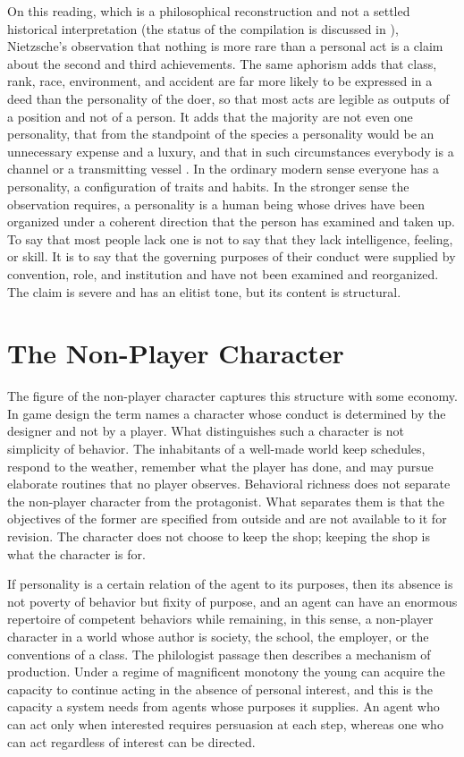 \documentclass[11pt]{article}
\begin{document}
On this reading, which is a philosophical reconstruction and not a settled historical interpretation (the status of the compilation is discussed in \cite{montinari2003}), Nietzsche's observation that nothing is more rare than a personal act \cite[Aph.\ 886(a)]{wtp2} is a claim about the second and third achievements. The same aphorism adds that class, rank, race, environment, and accident are far more likely to be expressed in a deed than the personality of the doer, so that most acts are legible as outputs of a position and not of a person. It adds that the majority are not even one personality, that from the standpoint of the species a personality would be an unnecessary expense and a luxury, and that in such circumstances everybody is a channel or a transmitting vessel \cite[Aph.\ 886(b)]{wtp2}. In the ordinary modern sense everyone has a personality, a configuration of traits and habits. In the stronger sense the observation requires, a personality is a human being whose drives have been organized under a coherent direction that the person has examined and taken up. To say that most people lack one is not to say that they lack intelligence, feeling, or skill. It is to say that the governing purposes of their conduct were supplied by convention, role, and institution and have not been examined and reorganized. The claim is severe and has an elitist tone, but its content is structural.

\section{The Non-Player Character}

The figure of the non-player character captures this structure with some economy. In game design the term names a character whose conduct is determined by the designer and not by a player. What distinguishes such a character is not simplicity of behavior. The inhabitants of a well-made world keep schedules, respond to the weather, remember what the player has done, and may pursue elaborate routines that no player observes. Behavioral richness does not separate the non-player character from the protagonist. What separates them is that the objectives of the former are specified from outside and are not available to it for revision. The character does not choose to keep the shop; keeping the shop is what the character is for.

If personality is a certain relation of the agent to its purposes, then its absence is not poverty of behavior but fixity of purpose, and an agent can have an enormous repertoire of competent behaviors while remaining, in this sense, a non-player character in a world whose author is society, the school, the employer, or the conventions of a class. The philologist passage then describes a mechanism of production. Under a regime of magnificent monotony the young can acquire the capacity to continue acting in the absence of personal interest, and this is the capacity a system needs from agents whose purposes it supplies. An agent who can act only when interested requires persuasion at each step, whereas one who can act regardless of interest can be directed.
\end{document}
